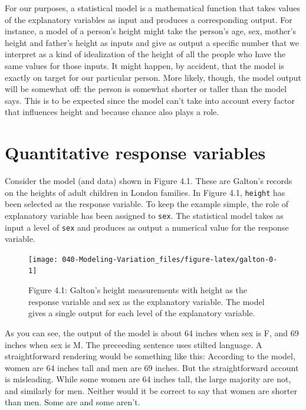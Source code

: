\documentclass[]{tufte-book}
\begin{document}
For our purposes, a statistical model is a mathematical function that takes values of the explanatory variables as input and produces a corresponding output. For instance, a model of a person's height might take the person's age, sex, mother's height and father's height as inputs and give as output a specific number that we interpret as a kind of idealization of the height of all the people who have the same values for those inputs. It might happen, by accident, that the model is exactly on target for our particular person. More likely, though, the model output will be somewhat off: the person is somewhat shorter or taller than the model says. This is to be expected since the model can't take into account every factor that influences height and because chance also plays a role.

\hypertarget{quantitative-response-variables}{%
\section{Quantitative response variables}\label{quantitative-response-variables}}

Consider the model (and data) shown in Figure 4.1. These are Galton's records on the heights of adult children in London families. In Figure 4.1, \texttt{height} has been selected as the response variable. To keep the example simple, the role of explanatory variable has been assigned to \texttt{sex}. The statistical model takes as input a level of \texttt{sex} and produces as output a numerical value for the response variable.

\begin{figure}\texttt{[image: 040-Modeling-Variation\_files/figure-latex/galton-0-1]} \caption[Figure 4.1]{Figure 4.1: Galton's height measurements with height as the response variable and sex as the explanatory variable. The model gives a single output for each level  of  the explanatory variable.}\label{fig:galton-0}
\end{figure}

As you can see, the output of the model is about 64 inches when sex is F, and 69 inches when sex is M. The preceeding sentence uses stilted language. A straightforward rendering would be something like this: According to the model, women are 64 inches tall and men are 69 inches. But the straightforward account is misleading. While some women are 64 inches tall, the large majority are not, and similarly for men. Neither would it be correct to say that women are shorter than men. Some are and some aren't.
\end{document}
